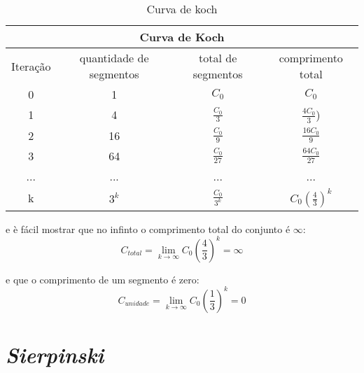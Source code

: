 {\renewcommand{\arraystretch}{1.5}
\begin{table}[h]
    \centering
        \begin{tabular}{| c | c | c | c |}
             \multicolumn{4}{c}{Curva de Koch} \\
             \hline
             Iteração & quantidade de segmentos & total de segmentos & comprimento total\\
             \hline
             0 & 1 & $ C_0 $ & $ C_0 $ \\
             \hline
             1 & 4 & $ \frac{ C_0 }{3} $ & $\frac{ 4C_{0} }{ 3 }$) \\
             \hline
             2 & 16 & $ \frac{ C_{0} }{9} $ & $\frac{ 16C_0}{9}$ \\
             \hline 
             3 & 64 & $ \frac{ C_{0} }{27} $ & $\frac{ 64C_0}{27}$ \\
             \hline
             ... & ... & ... & ... \\
             \hline
             k & $3^k$ & $ \frac{ C_{0} }{3^k} $ & $ C_0(\frac{4}{3})^k $ \\
             \hline
        \end{tabular}
    \caption{Curva de koch}
    \label{tab:koch}
\end{table}}

e è fácil mostrar que no infinto o comprimento total do conjunto é \(\infty\):
\[ C_{total} = \displaystyle \lim_{k\to\infty} C_0\left( \frac{4}{3} \right)^k = \infty \]

e que o comprimento de um segmento é zero:
\[ C_{unidade} = \displaystyle \lim_{k\to\infty} C_0\left( \frac{1}{3} \right)^k = 0 \]

\section{\textit{Sierpinski}}

